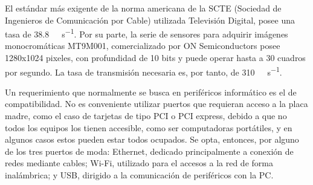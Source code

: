 


El estándar más exigente de la norma americana de la SCTE (Sociedad de Ingenieros de Comunicación por Cable) utilizada Televisión Digital, posee una tasa de \SI{38.8}{\mega\bit\per\second}\cite{SocietyofCableTelecommuniocationsEngineers2006}. Por su parte, la serie de sensores para adquirir imágenes monocromáticas MT9M001, comercializado por ON Semiconductors posee 1280x1024 pixeles, con profundidad de 10 bits y puede operar hasta a 30 cuadros por segundo\cite{MicronTechnology2004}. La tasa de transmisión necesaria es, por tanto, de \SI{310}{\mega\bit\per\second}.%

Un requerimiento que normalmente se busca en periféricos informático es el de compatibilidad. No es conveniente utilizar puertos que requieran acceso a la placa madre, como el caso de tarjetas de tipo PCI o PCI express, debido a que no todos los equipos los tienen accesible, como ser computadoras portátiles, y en algunos casos estos pueden estar todos ocupados. Se opta, entonces, por alguno de los tres puertos de moda: Ethernet, dedicado principalmente a conexión de redes mediante cables; Wi-Fi, utilizado para el accesos a la red de forma inalámbrica; y USB, dirigido a la comunicación de periféricos con la PC.%

